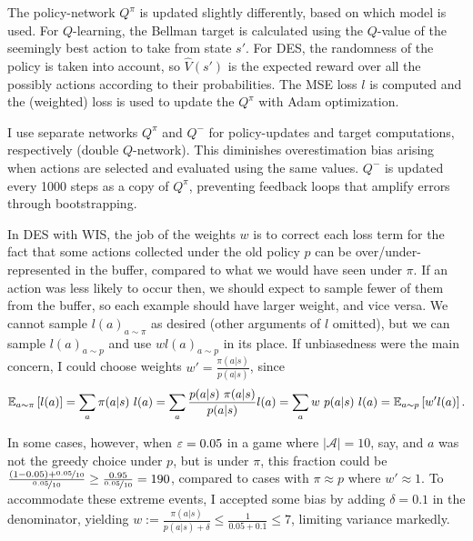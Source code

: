 \documentclass{article}
\begin{document}
The policy-network \(Q^\pi\) is updated slightly differently, based on which model is used. For \(Q\)-learning, the Bellman target is calculated using the \(Q\)-value of the seemingly best action to take from state \(s'\). For DES, the randomness of the policy is taken into account, so \(\hat{V}(s')\) is the expected reward over all the possibly actions according to their probabilities. The MSE loss \(l\) is computed and the (weighted) loss is used to update the \(Q^\pi\) with Adam optimization.

I use separate networks \(Q^\pi\) and \(Q^-\) for policy-updates and target computations, respectively (double \(Q\)-network). This diminishes overestimation bias arising when actions are selected and evaluated using the same values. \(Q^-\) is updated every 1000 steps as a copy of \(Q^\pi\), preventing feedback loops that amplify errors through bootstrapping.

In DES with WIS, the job of the weights \(w\) is to correct each loss term for the fact that some actions collected under the old policy \(p\) can be over/under-represented in the buffer, compared to what we would have seen under \(\pi\). If an action was less likely to occur then, we should expect to sample fewer of them from the buffer, so each example should have larger weight, and vice versa. We cannot sample \(l(a)_{a \sim \pi}\) as desired (other arguments of \(l\) omitted), but we can sample \(l(a)_{a \sim p}\) and use \(w l(a)_{a \sim p}\) in its place. If unbiasedness were the main concern, I could choose weights \(w' = \frac{\pi(a|s)}{p(a|s)}\), since
\[
    \mathbb{E}_{a \sim \pi}\left[ l(a) \right]
    = \sum_{a} {\pi(a|s) \ l(a)}
    = \sum_{a} {\frac{p(a|s) \ \pi(a|s)}{p(a|s)} l(a)}
    = \sum_{a} {w \ p(a|s) \ l(a)}
    = \mathbb{E}_{a \sim p} \left[ w' l(a) \right].
\]

In some cases, however, when \(\varepsilon=0.05\) in a game where \(|\mathcal{A}| = 10\), say, and \(a\) was not the greedy choice under \(p\), but is under \(\pi\), this fraction could be \(\frac{(1-0.05) + \nicefrac{0.05}{10}}{\nicefrac{0.05}{10}} \ge \frac{0.95}{\nicefrac{0.05}{10}} = 190\), compared to cases with \(\pi \approx p\) where \(w' \approx 1\). To accommodate these extreme events, I accepted some bias by adding \(\delta = 0.1\) in the denominator, yielding \(w := \frac{\pi(a|s)}{p(a|s) + \delta} \le \frac{1}{0.05 + 0.1} \le 7\), limiting variance markedly.
\end{document}
